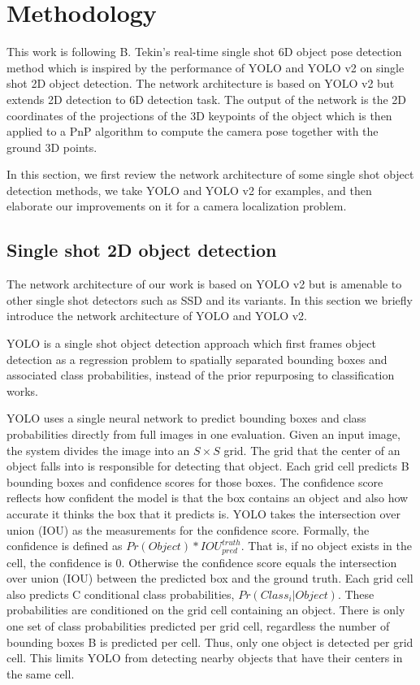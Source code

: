 \chapter{Methodology}

This work is following B. Tekin's real-time single shot 6D object pose detection method \cite{tekin2018real} which is inspired by the performance of YOLO \cite{redmon2016you} and YOLO v2 on single shot 2D object detection. The network architecture is based on YOLO v2  but extends 2D detection to 6D detection task. The output of the network is the 2D coordinates of the projections of the 3D keypoints of the object which is then applied to a PnP algorithm to compute the camera pose together with the ground 3D points.

In this section, we first review the network architecture of some single shot object detection methods, we take YOLO and YOLO v2  for examples, and then elaborate our improvements on it for a camera localization problem.

\section{Single shot 2D object detection}

The network architecture of our work is based on YOLO v2 but is amenable to other single shot detectors such as SSD and its variants. In this section we briefly introduce the network architecture of YOLO and YOLO v2.

YOLO \cite{redmon2016you} is a single shot object detection approach which first frames object detection as a regression problem to spatially separated bounding boxes and associated class probabilities, instead of the prior repurposing to classification works.

YOLO uses a single neural network to predict bounding boxes and class probabilities directly from full images in one evaluation. Given an input image, the system divides the image into an $S \times S$ grid. The grid that the center of an object falls into is responsible for detecting that object. Each grid cell predicts B bounding boxes and confidence scores for those boxes. The confidence score reflects how confident the model is that the box contains an object and also how accurate it thinks the box that it predicts is. YOLO takes the intersection over union (IOU) as the measurements for the confidence score. Formally, the confidence is defined as $Pr(Object) * IOU_{pred}^{truth}$. That is, if no object exists in the cell, the confidence is 0. Otherwise the confidence score equals the intersection over union (IOU) between the predicted box and the ground truth. Each grid cell also predicts C conditional class probabilities, $Pr(Class_{i}|Object)$. These probabilities are conditioned on the grid cell containing an object. There is only one set of class probabilities predicted per grid cell, regardless the number of bounding boxes B is predicted per cell. Thus, only one object is detected per grid cell. This limits YOLO from detecting nearby objects that have their centers in the same cell.

